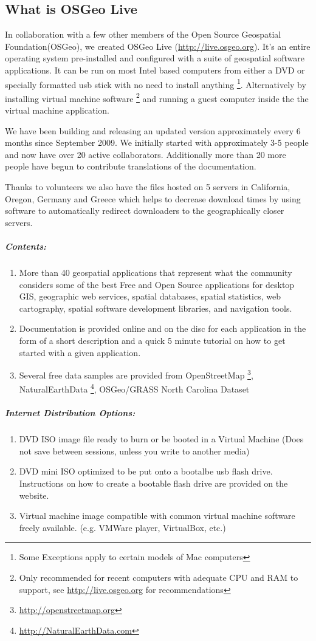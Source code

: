 \documentclass[12pt,letterpaper]{article}
\begin{document}
\subsection{What is OSGeo Live}
In collaboration with a few other members of the Open Source Geospatial Foundation(OSGeo), we created OSGeo Live (\url{http://live.osgeo.org}). It's an entire operating system pre-installed and configured with a suite of geospatial software applications. It can be run on most Intel based computers from either a DVD or specially formatted usb stick with no need to install anything \footnote{Some Exceptions apply to certain models of Mac computers}. Alternatively by installing virtual machine software \footnote{Only recommended for recent computers with adequate CPU and RAM to support, see \url{http://live.osgeo.org} for recommendations} and running a guest computer inside the the virtual machine application.

We have been building and releasing an updated version approximately every 6 months since September 2009. We initially started with approximately 3-5 people and now have over 20 active collaborators. Additionally more than 20 more people have begun to contribute translations of the documentation.  

Thanks to volunteers we also have the files hosted on 5 servers in California, Oregon, Germany and Greece which helps to decrease download times by using software to automatically redirect downloaders to the geographically closer servers.

\subparagraph{Contents:}
\begin{enumerate}
\item More than 40 geospatial applications that represent what the community considers some of the best Free and Open Source applications for desktop GIS, geographic web services, spatial databases, spatial statistics, web cartography, spatial software development libraries, and navigation tools.
\item Documentation is provided online and on the disc for each application in the form of a short description and a quick 5 minute tutorial on how to get started with a given application.
\item Several free data samples are provided from OpenStreetMap \footnote{\url{http://openstreetmap.org}}, NaturalEarthData \footnote{\url{http://NaturalEarthData.com}}, OSGeo/GRASS North Carolina Dataset
\end{enumerate}

\subparagraph{Internet Distribution Options:}
\begin{enumerate}
\item DVD ISO image file ready to burn or be booted in a Virtual Machine (Does not save between sessions, unless you write to another media)
\item DVD mini ISO optimized to be put onto a bootalbe usb flash drive. Instructions on how to create a bootable flash drive are provided on the website.
\item Virtual machine image compatible with common virtual machine software freely available. (e.g. VMWare player, VirtualBox, etc.)
\end{enumerate}
\end{document}
